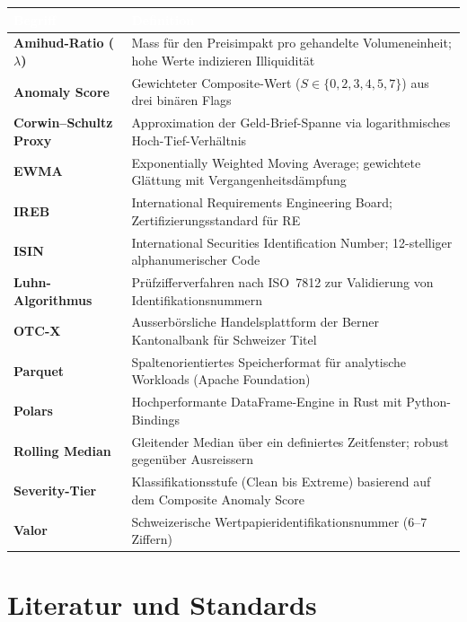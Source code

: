 \documentclass[11pt, a4paper, oneside, openany]{report}
\begin{document}
\begin{table}[H]
\centering
{}
\sffamily\small
\begin{tabularx}{\textwidth}{>{\bfseries\sffamily}p{3.5cm} X}
  \toprule
  \rowcolor{DeepNavy} \textcolor{white}{\textbf{Begriff}} & \textcolor{white}{\textbf{Definition}} \\
  \midrule
  Amihud-Ratio ($\lambda$) & Mass für den Preisimpakt pro gehandelte Volumeneinheit; hohe Werte indizieren Illiquidität \\
  Anomaly Score             & Gewichteter Composite-Wert ($S \in \{0,2,3,4,5,7\}$) aus drei binären Flags \\
  Corwin--Schultz Proxy     & Approximation der Geld-Brief-Spanne via logarithmisches Hoch-Tief-Verhältnis \\
  EWMA                      & Exponentially Weighted Moving Average; gewichtete Glättung mit Vergangenheitsdämpfung \\
  IREB                      & International Requirements Engineering Board; Zertifizierungsstandard für RE \\
  ISIN                      & International Securities Identification Number; 12-stelliger alphanumerischer Code \\
  Luhn-Algorithmus          & Prüfzifferverfahren nach ISO~7812 zur Validierung von Identifikationsnummern \\
  OTC-X                     & Ausserbörsliche Handelsplattform der Berner Kantonalbank für Schweizer Titel \\
  Parquet                   & Spaltenorientiertes Speicherformat für analytische Workloads (Apache Foundation) \\
  Polars                    & Hochperformante DataFrame-Engine in Rust mit Python-Bindings \\
  Rolling Median            & Gleitender Median über ein definiertes Zeitfenster; robust gegenüber Ausreissern \\
  Severity-Tier             & Klassifikationsstufe (Clean bis Extreme) basierend auf dem Composite Anomaly Score \\
  Valor                     & Schweizerische Wertpapieridentifikationsnummer (6--7 Ziffern) \\
  \bottomrule
\end{tabularx}
\end{table}

\section{Literatur und Standards}
\end{document}
